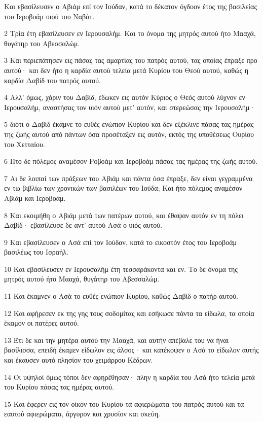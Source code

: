 \par Και εβασίλευσεν ο Αβιάμ επί τον Ιούδαν, κατά το δέκατον όγδοον έτος της βασιλείας του Ιεροβοάμ υιού του Ναβάτ.
\par 2 Τρία έτη εβασίλευσεν εν Ιερουσαλήμ. Και το όνομα της μητρός αυτού ήτο Μααχά, θυγάτηρ του Αβεσσαλώμ.
\par 3 Και περιεπάτησεν εις πάσας τας αμαρτίας του πατρός αυτού, τας οποίας έπραξε προ αυτού· και δεν ήτο η καρδία αυτού τελεία μετά Κυρίου του Θεού αυτού, καθώς η καρδία Δαβίδ του πατρός αυτού.
\par 4 Αλλ' όμως, χάριν του Δαβίδ, έδωκεν εις αυτόν Κύριος ο Θεός αυτού λύχνον εν Ιερουσαλήμ, αναστήσας τον υιόν αυτού μετ' αυτόν, και στερεώσας την Ιερουσαλήμ·
\par 5 διότι ο Δαβίδ έκαμνε το ευθές ενώπιον Κυρίου και δεν εξέκλινε πάσας τας ημέρας της ζωής αυτού από πάντων όσα προσέταξεν εις αυτόν, εκτός της υποθέσεως Ουρίου του Χετταίου.
\par 6 Ήτο δε πόλεμος αναμέσον Ροβοάμ και Ιεροβοάμ πάσας τας ημέρας της ζωής αυτού.
\par 7 Αι δε λοιπαί των πράξεων του Αβιάμ και πάντα όσα έπραξε, δεν είναι γεγραμμένα εν τω βιβλίω των χρονικών των βασιλέων του Ιούδα; Και ήτο πόλεμος αναμέσον Αβιάμ και Ιεροβοάμ.
\par 8 Και εκοιμήθη ο Αβιάμ μετά των πατέρων αυτού, και έθαψαν αυτόν εν τη πόλει Δαβίδ· εβασίλευσε δε αντ' αυτού Ασά ο υιός αυτού.
\par 9 Και εβασίλευσεν ο Ασά επί τον Ιούδαν, κατά το εικοστόν έτος του Ιεροβοάμ βασιλέως του Ισραήλ.
\par 10 Και εβασίλευσεν εν Ιερουσαλήμ έτη τεσσαράκοντα και εν. Το δε όνομα της μητρός αυτού ήτο Μααχά, θυγάτηρ του Αβεσσαλώμ.
\par 11 Και έκαμνεν ο Ασά το ευθές ενώπιον Κυρίου, καθώς Δαβίδ ο πατήρ αυτού.
\par 12 Και αφήρεσεν εκ της γης τους σοδομίτας και εσήκωσε πάντα τα είδωλα, τα οποία έκαμον οι πατέρες αυτού.
\par 13 Έτι δε και την μητέρα αυτού την Μααχά, και αυτήν απέβαλε του να ήναι βασίλισσα, επειδή έκαμεν είδωλον εις άλσος· και κατέκοψεν ο Ασά το είδωλον αυτής και έκαυσεν αυτό πλησίον του χειμάρρου Κέδρων.
\par 14 Οι υψηλοί όμως τόποι δεν αφηρέθησαν· πλην η καρδία του Ασά ήτο τελεία μετά του Κυρίου πάσας τας ημέρας αυτού.
\par 15 Και έφερεν εις τον οίκον του Κυρίου τα αφιερώματα του πατρός αυτού και τα εαυτού αφιερώματα, άργυρον και χρυσίον και σκεύη.
